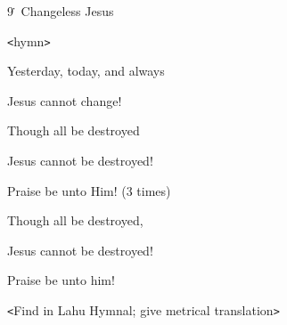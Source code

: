 
9\. Changeless Jesus

\texttt{<}hymn\texttt{>}

Yesterday, today, and always

Jesus cannot change!

Though all be destroyed

Jesus cannot be destroyed!

Praise be unto Him! (3 times)

Though all be destroyed,

Jesus cannot be destroyed!

Praise be unto him!

\texttt{<}Find in Lahu Hymnal; give metrical translation\texttt{>}


